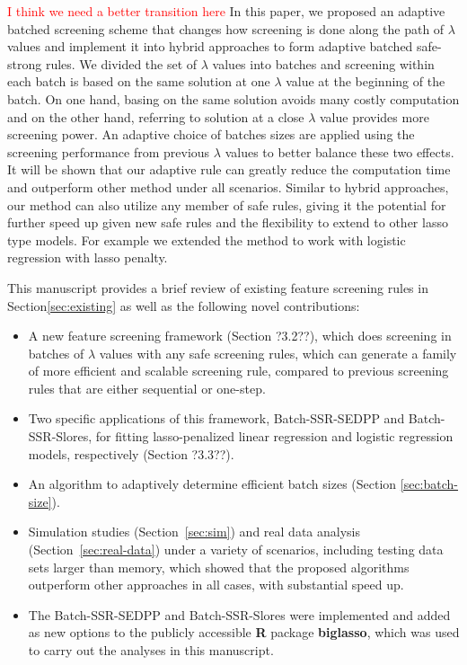 \documentclass{article}
\providecommand{\note}[1]{\textcolor{red}{#1}}
\begin{document}
\note{I think we need a better transition here} In this paper, we proposed an adaptive batched screening scheme that changes how screening is done along the path of $\lambda$ values and implement it into hybrid approaches to form adaptive batched safe-strong rules. We divided the set of $\lambda$ values into batches and screening within each batch is based on the same solution at one $\lambda$ value at the beginning of the batch. On one hand, basing on the same solution avoids many costly computation and on the other hand, referring to solution at a close $\lambda$ value provides more screening power. An adaptive choice of batches sizes are applied using the screening performance from previous $\lambda$ values to better balance these two effects. It will be shown that our adaptive rule can greatly reduce the computation time and outperform other method under all scenarios. Similar to hybrid approaches, our method can also utilize any member of safe rules, giving it the potential for further speed up given new safe rules and the flexibility to extend to other lasso type models. For example we extended the method to work with logistic regression with lasso penalty.

This manuscript provides a brief review of existing feature screening rules in Section\ref{sec:existing} as well as the following novel contributions:

\begin{itemize}
    \item A new feature screening framework (Section ?3.2??), which does screening in batches of $\lambda$ values with any safe screening rules, which can generate a family of more efficient and scalable screening rule, compared to previous screening rules that are either sequential or one-step.
    \item Two specific applications of this framework, Batch-SSR-SEDPP and Batch-SSR-Slores, for fitting lasso-penalized linear regression and logistic regression models, respectively (Section ?3.3??).
    \item An algorithm to adaptively determine efficient batch sizes (Section \ref{sec:batch-size}).
    \item Simulation studies (Section~\ref{sec:sim}) and real data analysis (Section~\ref{sec:real-data}) under a variety of scenarios, including testing data sets larger than memory, which showed that the proposed algorithms outperform other approaches in all cases, with substantial speed up.
    \item The Batch-SSR-SEDPP and Batch-SSR-Slores were implemented and added as new options to the publicly accessible \textbf{R} package \textbf{biglasso}\cite{zeng2017biglasso}, which was used to carry out the analyses in this manuscript.
\end{itemize}
\end{document}
